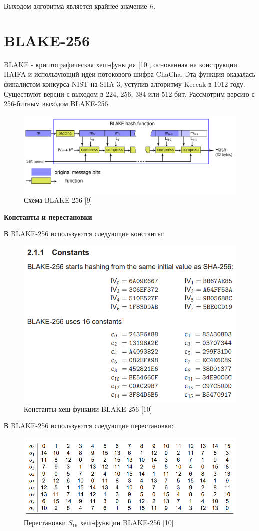\documentclass[colorthm]{./civarticle}
\begin{document}
Выходом алгоритма является крайнее значение $h$.

\section{BLAKE-256}
BLAKE - криптографическая хеш-функция [10], основанная на конструкции HAIFA и использующий идеи потокового шифра ChaCha. Эта функция оказалась финалистом конкурса NIST на SHA-3, уступив алгоритму Keccak в 1012 году. Существуют версии с выходом в 224, 256, 384 или 512 бит. Рассмотрим версию с 256-битным выходом BLAKE-256.

\begin{figure}[H]
    \centering
    \includegraphics[width=0.75\linewidth]{BLAKE_algorythm.png}
    \caption{Схема BLAKE-256 [9]}
    \label{fig:enter-label}
\end{figure}

\textbf{Константы и перестановки}

В BLAKE-256 используются следующие константы:

\begin{figure}[H]
    \centering
    \includegraphics[width=0.5\linewidth]{constants_blake.png}
    \caption{Константы хеш-функции BLAKE-256 [10]}
    \label{fig:enter-label}
\end{figure}

В BLAKE-256 используются следующие перестановки:

\begin{figure}[H]
    \centering
    \includegraphics[width=0.5\linewidth]{permutations_blake.png}
    \caption{Перестановки $S_16$ хеш-функции BLAKE-256 [10]}
    \label{fig:enter-label}
\end{figure}
\end{document}
